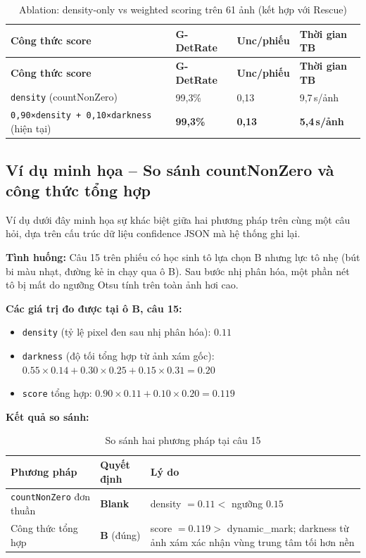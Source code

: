 \begin{longtable}{|L{4.5cm}|L{2.5cm}|L{2.2cm}|L{4.5cm}|}
\caption{Ablation: density-only vs weighted scoring trên 61 ảnh (kết hợp với Rescue)}
\label{tab:scoring-ablation}\\
\hline
\textbf{Công thức score} & \textbf{G-DetRate} & \textbf{Unc/phiếu} & \textbf{Thời gian TB} \\
\hline
\endfirsthead
\hline
\textbf{Công thức score} & \textbf{G-DetRate} & \textbf{Unc/phiếu} & \textbf{Thời gian TB} \\
\hline
\endhead
\texttt{density} (countNonZero) & 99{,}3\% & 0{,}13 & 9{,}7\,s/ảnh \\
\hline
\texttt{0,90×density + 0,10×darkness} (hiện tại) & \textbf{99{,}3\%} & \textbf{0{,}13} & \textbf{5{,}4\,s/ảnh} \\
\hline
\end{longtable}

\subsection{Ví dụ minh họa -- So sánh countNonZero và công thức tổng hợp}

Ví dụ dưới đây minh họa sự khác biệt giữa hai phương pháp trên cùng một câu hỏi, dựa trên cấu trúc dữ liệu confidence JSON mà hệ thống ghi lại.

\textbf{Tình huống:} Câu 15 trên phiếu có học sinh tô lựa chọn B nhưng lực tô nhẹ (bút bi màu nhạt, đường kẻ in chạy qua ô B). Sau bước nhị phân hóa, một phần nét tô bị mất do ngưỡng Otsu tính trên toàn ảnh hơi cao.

\textbf{Các giá trị đo được tại ô B, câu 15:}
\begin{itemize}[leftmargin=1.5cm]
  \item \texttt{density} (tỷ lệ pixel đen sau nhị phân hóa): $0.11$
  \item \texttt{darkness} (độ tối tổng hợp từ ảnh xám gốc):
    $0.55 \times 0.14 + 0.30 \times 0.25 + 0.15 \times 0.31 = 0.20$
  \item \texttt{score} tổng hợp: $0.90 \times 0.11 + 0.10 \times 0.20 = 0.119$
\end{itemize}

\textbf{Kết quả so sánh:}

\begin{longtable}{|L{5.5cm}|L{2.5cm}|L{5.8cm}|}
\caption{So sánh hai phương pháp tại câu 15}
\label{tab:vi-du-bubble-score}\\
\hline
\textbf{Phương pháp} & \textbf{Quyết định} & \textbf{Lý do} \\
\hline
\texttt{countNonZero} đơn thuần & \textbf{Blank} & density $= 0.11 <$ ngưỡng $0.15$ \\
\hline
Công thức tổng hợp & \textbf{B} (đúng) & score $= 0.119 >$ dynamic\_mark; darkness từ ảnh xám xác nhận vùng trung tâm tối hơn nền \\
\hline
\end{longtable}

